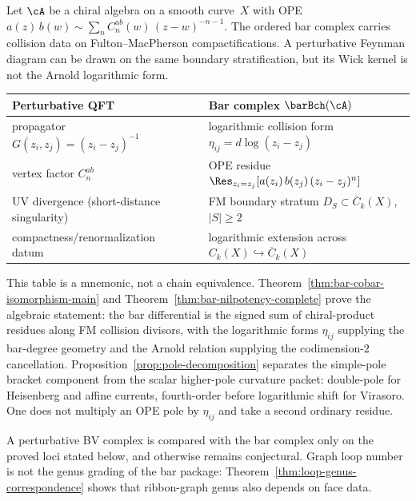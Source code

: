 \begin{remark}
\label{rem:feynman-bar-bridge}
Let $\cA$ be a chiral algebra on a smooth curve~$X$ with OPE
$a(z)\,b(w) \sim \sum_n C^{ab}_n(w)\,(z-w)^{-n-1}$.
The ordered bar complex carries collision data on
Fulton--MacPherson compactifications.  A perturbative Feynman diagram
can be drawn on the same boundary stratification, but its Wick kernel is
not the Arnold logarithmic form.
\begin{center}
\renewcommand{\arraystretch}{1.25}
\begin{tabular}{lcl}
\textbf{Perturbative QFT} && \textbf{Bar complex $\barBch(\cA)$} \\
\hline
propagator $G(z_i,z_j) = (z_i-z_j)^{-1}$
 && logarithmic collision form
 $\eta_{ij} = d\log(z_i - z_j)$ \\
vertex factor $C^{ab}_n$
 && OPE residue $\Res_{z_i = z_j}[a(z_i)\,b(z_j)\,(z_i-z_j)^n]$ \\
UV divergence (short-distance singularity)
 && FM boundary stratum $D_S\subset\overline{C}_k(X)$, $|S|\ge 2$ \\
compactness/renormalization datum
 && logarithmic extension across $C_k(X) \hookrightarrow
 \overline{C}_k(X)$
\end{tabular}
\end{center}
This table is a mnemonic, not a chain equivalence.  Theorem~\ref{thm:bar-cobar-isomorphism-main}
and Theorem~\ref{thm:bar-nilpotency-complete} prove the algebraic
statement: the bar differential is the signed sum of chiral-product
residues along FM collision divisors, with the logarithmic forms
$\eta_{ij}$ supplying the bar-degree geometry and the Arnold relation
supplying the codimension-$2$ cancellation.  Proposition~\ref{prop:pole-decomposition}
separates the simple-pole bracket component from the scalar higher-pole
curvature packet: double-pole for Heisenberg and affine currents,
fourth-order before logarithmic shift for Virasoro. One does not
multiply an OPE pole by $\eta_{ij}$ and take a second ordinary residue.

A perturbative BV complex is compared with the bar complex only on the
proved loci stated below, and otherwise remains conjectural.  Graph loop
number is not the genus grading of the bar package:
Theorem~\ref{thm:loop-genus-correspondence} shows that ribbon-graph
genus also depends on face data.
\end{remark}

